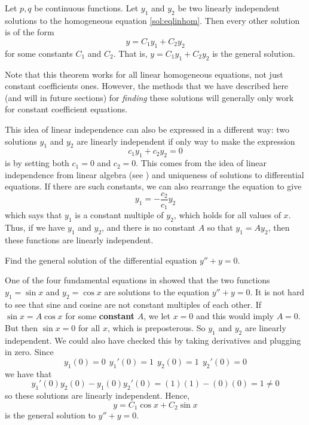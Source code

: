 \begin{theorem1}{}
Let $p, q$ be continuous functions.
Let $y_1$ and $y_2$ be two linearly independent
solutions to the homogeneous equation \eqref{sol:eqlinhom}. 
Then every other solution is 
of the form
\begin{equation*}
y = C_1 y_1 + C_2 y_2
\end{equation*} for some constants $C_1$ and $C_2$. That is, $y = C_1 y_1 + C_2 y_2$ is the general solution.
\end{theorem1}

Note that this theorem works for all linear homogeneous equations, not just constant coefficients ones. However, the methods that we have described here (and will in future sections) for \emph{finding} these solutions will generally only work for constant coefficient equations.

This idea of linear independence can also be expressed in a different way: two solutions $y_1$ and $y_2$ are linearly independent if only way to make the expression \[c_1 y_1 + c_2 y_2 = 0 \] is by setting both $c_1 = 0$ and $c_2 = 0$. This comes from the idea of linear independence from linear algebra (see ) and uniqueness of solutions to differential equations. If there are such constants, we can also rearrange the equation to give
\[ y_1 = -\frac{c_2}{c_1}y_2 \] which says that $y_1$ is a constant multiple of $y_2$, which holds for all values of $x$. Thus, if we have $y_1$ and $y_2$, and there is no constant $A$ so that $y_1 = Ay_2$, then these functions are linearly independent. 

\begin{example}
Find the general solution of the differential equation $y'' + y = 0$.
\end{example}

\begin{exampleSol}
One of the four fundamental equations in  showed that the two functions $y_1 = \sin x$ and $y_2 = \cos x$ are solutions to the
equation $y'' + y = 0$.  It is not hard to see that sine and cosine are not
constant
multiples of each other.  If $\sin x = A \cos x$ for some \textbf{constant} $A$,
we let $x=0$ and this would imply $A = 0$.  But then $\sin x = 0$ for all
$x$, which is preposterous.
So $y_1$ and $y_2$ are linearly independent.  We could also have checked this by taking derivatives and plugging in zero. Since 
\begin{equation*}
y_1(0) = 0 \ \ y_1'(0) = 1\ \ y_2(0) = 1\ \ y_2'(0) = 0 
\end{equation*}
we have that
\begin{equation*}
y_1'(0)y_2(0) - y_1(0)y_2'(0) = (1)(1) - (0)(0) = 1 \neq 0
\end{equation*}
so these solutions are linearly independent. Hence,
\begin{equation*}
y = C_1 \cos x + C_2 \sin x 
\end{equation*}
is the general solution to $y'' + y = 0$.
\end{exampleSol}


